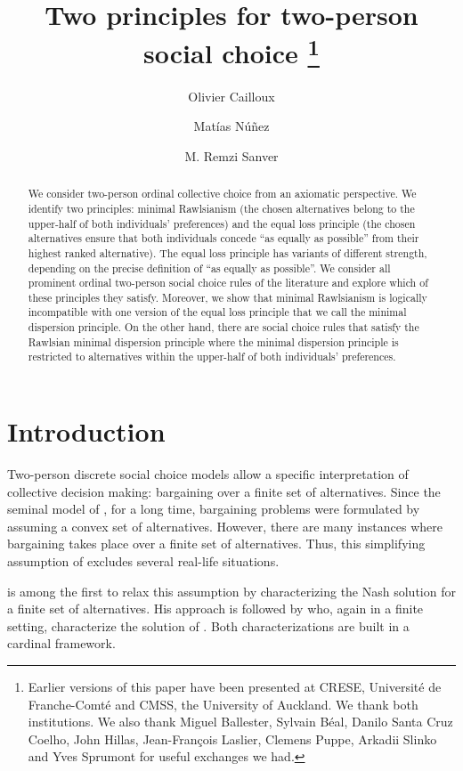 \documentclass[pagesize, twoside=off, bibliography=totoc, DIV=calc, fontsize=12pt, a4paper]{scrartcl}
\title{Two principles for two-person social choice \thanks{Earlier versions of this paper have been presented at CRESE, Université de Franche-Comté and CMSS, the University of Auckland. We thank both institutions. We also thank Miguel Ballester, Sylvain Béal, Danilo Santa Cruz Coelho, John Hillas, Jean-François Laslier, Clemens Puppe, Arkadii Slinko and Yves Sprumont for useful exchanges we had.}}
\author[*]{Olivier Cailloux}
\author[**]{Matías Núñez}
\author[*]{M. Remzi Sanver}
\affil[*]{Université Paris-Dauphine, PSL Research University, CNRS, LAMSADE, 75016 PARIS, FRANCE}
\affil[**]{CREST, CNRS, École Polytechnique, GENES, ENSAE Paris, Institut Polytechnique de Paris, 91120 Palaiseau, France.}
\begin{document}
\maketitle

\begin{abstract}
    We consider two-person ordinal collective choice from an axiomatic perspective. We identify two principles: minimal Rawlsianism (the chosen alternatives belong to the upper-half of both individuals’ preferences) and the equal loss principle (the chosen alternatives ensure that both individuals concede “as equally as possible” from their highest ranked alternative). The equal loss principle has variants of different strength, depending on the precise definition of “as equally as possible”. We consider all prominent ordinal two-person social choice rules of the literature and explore which of these principles they satisfy. Moreover, we show that minimal Rawlsianism is logically incompatible with one version of the equal loss principle that we call the minimal dispersion principle. On the other hand, there are social choice rules that satisfy the Rawlsian minimal dispersion principle where the minimal dispersion principle is restricted to alternatives within the upper-half of both individuals’ preferences.
\end{abstract}

\section{Introduction}
\label{sec:intro}
Two-person discrete social choice models allow a specific interpretation of collective decision making: bargaining over a finite set of alternatives. Since the seminal model of \citet{Nash1950}, for a long time, bargaining problems were formulated by assuming a convex set of alternatives. However, there are many instances where bargaining takes place over a finite set of alternatives. Thus, this simplifying assumption of \citeauthor{Nash1950} excludes several real-life situations. 

 is among the first to relax this assumption by characterizing the Nash solution for a finite set of alternatives. His approach is followed by \citet{nagahisa2002axiomatization} who, again in a finite setting, characterize the solution of \citet{kalai1975other}. Both characterizations are built in a cardinal framework. 
 
\end{document}
